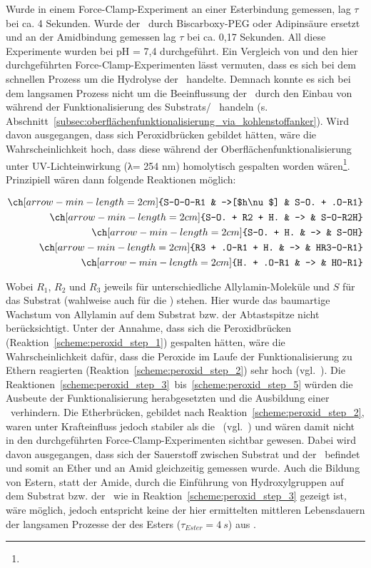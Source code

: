 Wurde in einem Force-Clamp-Experiment an einer Esterbindung gemessen, lag $\tau$ bei ca. 4 Sekunden. Wurde der \spacer~durch Biscarboxy-PEG oder Adipinsäure ersetzt und an der Amidbindung gemessen lag $\tau$ bei ca. 0,17 Sekunden. All diese Experimente wurden bei pH = 7,4 durchgeführt. Ein Vergleich von \cite{ClausenSchaumann.2018} und den hier durchgeführten Force-Clamp-Experimenten lässt vermuten, dass es sich bei dem schnellen Prozess um die Hydrolyse der \amid~handelte. Demnach konnte es sich bei dem langsamen Prozess nicht um die Beeinflussung der \amid~durch den Einbau von  während der Funktionalisierung des Substrats/ \spitze~handeln (s. Abschnitt~\ref{subsec:oberflächenfunktionalisierung_via_kohlenstoffanker}). Wird davon ausgegangen, dass sich Peroxidbrücken gebildet hätten, wäre die Wahrscheinlichkeit hoch, dass diese während der Oberflächenfunktionalisierung unter UV-Lichteinwirkung (λ= 254 nm) homolytisch gespalten worden wären\footnote{\noteOne}. Prinzipiell wären dann folgende Reaktionen möglich: 


\begin{eqnarray}
	\ch[arrow-min-length=2cm]{S-O-O-R1	&	->[$h\nu$]	&	S-O. + .O-R1} \label{scheme:peroxid_step_1}\\
	\ch[arrow-min-length=2cm]{S-O. + R2 + H.	&	->	&	S-O-R2H} \label{scheme:peroxid_step_2}\\
	\ch[arrow-min-length=2cm]{S-O. + H.	&	->	&	S-OH} \label{scheme:peroxid_step_3}\\
	\ch[arrow-min-length=2cm]{R3 + .O-R1 + H.	&	->	&	HR3-O-R1} \label{scheme:peroxid_step_4}\\
	\ch[arrow-min-length=2cm]{H. + .O-R1	&	->	&	HO-R1} \label{scheme:peroxid_step_5}
\end{eqnarray}

Wobei $R_1$, $R_2$ und $R_3$ jeweils für unterschiedliche Allylamin-Moleküle und $S$ für das Substrat (wahlweise auch für die \spitze) stehen. Hier wurde das baumartige Wachstum von Allylamin auf dem Substrat bzw. der Abtastspitze nicht berücksichtigt. Unter der Annahme, dass sich die Peroxidbrücken (Reaktion~\ref{scheme:peroxid_step_1}) gespalten hätten, wäre die Wahrscheinlichkeit dafür, dass die Peroxide im Laufe der Funktionalisierung zu Ethern reagierten (Reaktion~\ref{scheme:peroxid_step_2}) sehr hoch (vgl.~\cite[15]{Latscha.2016}). Die Reaktionen~\ref{scheme:peroxid_step_3}~bis~\ref{scheme:peroxid_step_5} würden die Ausbeute der Funktionalisierung herabgesetzten und die Ausbildung einer \amid~verhindern. Die Etherbrücken, gebildet nach Reaktion~\ref{scheme:peroxid_step_2}, waren unter Krafteinfluss jedoch stabiler als die \amid~(vgl.~\cite{ClausenSchaumann.2018}) und wären damit nicht in den durchgeführten Force-Clamp-Experimenten sichtbar gewesen. Dabei wird davon ausgegangen, dass sich der Sauerstoff zwischen Substrat und der \amid~befindet und somit an Ether und an Amid gleichzeitig gemessen wurde. Auch die Bildung von Estern, statt der Amide, durch die Einführung von Hydroxylgruppen auf dem Substrat bzw. der \spitze~wie in Reaktion~\ref{scheme:peroxid_step_3} gezeigt ist, wäre möglich, jedoch entspricht keine der hier ermittelten mittleren Lebensdauern der langsamen Prozesse der des Esters ($\tau_{Ester}  = 4~s$) aus \cite{ClausenSchaumann.2018}.\\

